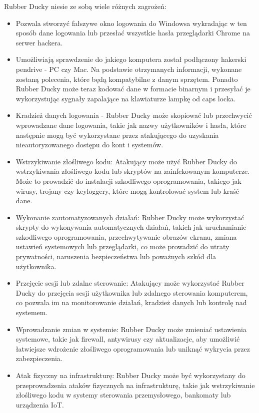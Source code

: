 \documentclass{article}
\begin{document}
Rubber Ducky niesie ze sobą wiele różnych zagrożeń:
\begin{itemize}
    \item Pozwala stworzyć fałszywe okno logowania do Windowsa wykradając w ten sposób dane logowania lub przesłać wszystkie hasła przeglądarki Chrome na serwer hackera. 
    \item Umożliwiają sprawdzenie do jakiego komputera został podłączony hakerski pendrive - PC czy Mac. Na podstawie otrzymanych informacji, wykonane zostaną polecenia, które będą kompatybilne z danym sprzętem. Ponadto Rubber Ducky może teraz kodować dane w formacie binarnym i przesyłać je wykorzystując sygnały zapalające na klawiaturze lampkę od caps locka.
    \item Kradzież danych logowania - Rubber Ducky może skopiować lub przechwycić wprowadzane dane logowania, takie jak nazwy użytkowników i hasła, które następnie mogą być wykorzystane przez atakującego do uzyskania nieautoryzowanego dostępu do kont i systemów.
    \item Wstrzykiwanie złośliwego kodu: Atakujący może użyć Rubber Ducky do wstrzykiwania złośliwego kodu lub skryptów na zainfekowanym komputerze. Może to prowadzić do instalacji szkodliwego oprogramowania, takiego jak wirusy, trojany czy keyloggery, które mogą kontrolować system lub kraść dane.
    \item Wykonanie zautomatyzowanych działań: Rubber Ducky może wykorzystać skrypty do wykonywania automatycznych działań, takich jak uruchamianie szkodliwego oprogramowania, przechwytywanie obrazów ekranu, zmiana ustawień systemowych lub przeglądarki, co może prowadzić do utraty prywatności, naruszenia bezpieczeństwa lub poważnych szkód dla użytkownika.
    \item  Przejęcie sesji lub zdalne sterowanie: Atakujący może wykorzystać Rubber Ducky do przejęcia sesji użytkownika lub zdalnego sterowania komputerem, co pozwala im na monitorowanie działań, kradzież danych lub kontrolę nad systemem.
    \item Wprowadzanie zmian w systemie: Rubber Ducky może zmieniać ustawienia systemowe, takie jak firewall, antywirusy czy aktualizacje, aby umożliwić łatwiejsze wdrożenie złośliwego oprogramowania lub uniknąć wykrycia przez zabezpieczenia.
    \item  Atak fizyczny na infrastrukturę: Rubber Ducky może być wykorzystany do przeprowadzenia ataków fizycznych na infrastrukturę, takie jak wstrzykiwanie złośliwego kodu w systemy sterowania przemysłowego, bankomaty lub urządzenia IoT.

    
\end{itemize} 
\end{document}
